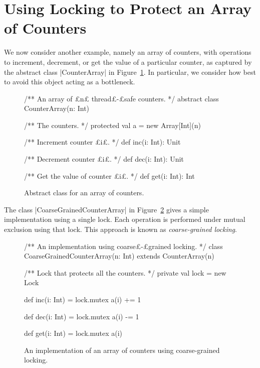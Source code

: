 \section{Using Locking to Protect an Array of Counters}
\label{sec:Amdahl}

We now consider another example, namely an array of counters, with operations
to increment, decrement, or get the value of a particular counter, as captured
by the abstract class |CounterArray| in Figure~\ref{fig:CounterArray}.  In
particular, we consider how best to avoid this object acting as a bottleneck.


\begin{figure}[tpbh]
\begin{scala}
/** An array of £n£ thread£-£safe counters. */
abstract class CounterArray(n: Int){
  /** The counters. */
  protected val a = new Array[Int](n)

  /** Increment counter £i£. */
  def inc(i: Int): Unit

  /** Decrement counter £i£. */
  def dec(i: Int): Unit

  /** Get the value of counter £i£. */
  def get(i: Int): Int
}
\end{scala}
\caption{Abstract class for an array of counters.}
\label{fig:CounterArray}
\end{figure}


The class |CoarseGrainedCounterArray| in
Figure~\ref{fig:CoarseGrainedCounterArray} gives a simple implementation using
a single lock.  Each operation is performed under mutual exclusion using that
lock.  This approach is known as \emph{coarse-grained
  locking}.  

\begin{figure}
\begin{scala}
/** An implementation using coarse£-£grained locking. */
class CoarseGrainedCounterArray(n: Int) extends CounterArray(n){
  /** Lock that protects all the counters. */
  private val lock = new Lock

  def inc(i: Int) = lock.mutex{ a(i) += 1 }

  def dec(i: Int) = lock.mutex{ a(i) -= 1 }

  def get(i: Int) = lock.mutex{ a(i) }
}
\end{scala}
\caption{An implementation of an array of counters using coarse-grained
   locking.}
\label{fig:CoarseGrainedCounterArray}
\end{figure}

